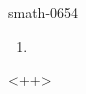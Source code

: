 
\begin{corrige}{smath-0654}

    \begin{enumerate}
        \item
            
    \end{enumerate}
    <++>

\end{corrige}
